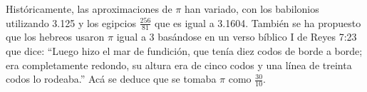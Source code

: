 \documentclass[preview]{standalone}
\begin{document}
\begin{center}
Históricamente, las aproximaciones de $\pi$ han variado, con los babilonios utilizando 3.125 y los egipcios $\frac{256}{81}$ que es igual a 3.1604.\n
También se ha propuesto que los hebreos usaron $\pi$ igual a 3 basándose en un verso bíblico I de Reyes 7:23 que dice: ``Luego hizo el mar de fundición, que tenía diez codos de borde a borde; era completamente redondo, su altura era de cinco codos y una línea de treinta codos lo rodeaba.'' Acá se deduce que se tomaba $\pi$ como $\frac{30}{10}$.
\end{center}
\end{document}
